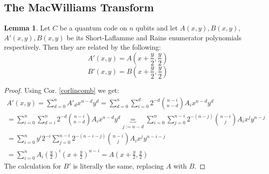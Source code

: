 \documentclass[12pt,a4paper,BCOR15mm,twoside,DIV12]{article}
\newenvironment{bew}{\begin{proof}[Proof]}{\end{proof}}
\theoremstyle{definition}
\newtheorem{lem}[Satz]{Lemma}
\begin{document}
\subsection{The MacWilliams Transform}

\begin{lem}\label{relenums}
Let $C$ be a quantum code on $n$ qubits and let $A(x,y),B(x,y)$, \\$ A'(x,y), B(x,y)$ be its Short-Laflamme and Rains enumerator polynomials respectively. Then they are related by the following:
\begin{equation} A'(x,y) = A(x + \frac{y}{2},\frac{y}{2}) \end{equation}
\begin{equation} B'(x,y) = B(x + \frac{y}{2},\frac{y}{2}) \end{equation}
\begin{bew}
Using Cor. \ref{corlincomb} we get: 
\begin{align*} A'(x,y) = \sum_{d=0}^n A'_d x^{n-d}y^d = \sum_{d=0}^n \sum_{i=0}^d 2^{-d} \binom{ n-i}{n-d} A_i x^{n-d}y^d 
\\ = \sum_{i=0}^n \sum_{d=i}^n 2^{-d} \binom{ n-i}{n-d} A_i x^{n-d}y^d \underbrace{ = }_{j:= n-d} \sum_{i=0}^n \sum_{j=0}^{n-i} 2^{-(n-j)} \binom{ n-i}{j} A_i x^{j}y^{n-j} 
\\ = \sum_{i=0}^n y^{i}2^{-i} \sum_{j=0}^{n-i} 2^{-(n-i-j)} \binom{ n-i}{j} A_i x^{j}y^{n-i-j} 
\\ = \sum_{i=0}^n A_i (\frac{y}{2})^i (x+\frac{y}{2})^{n-i} = A(x+\frac{y}{2},\frac{y}{2}) \end{align*}
The calculation for $B'$ is literally the same, replacing $A$ with $B$.
\end{bew}
\end{lem}
\end{document}
